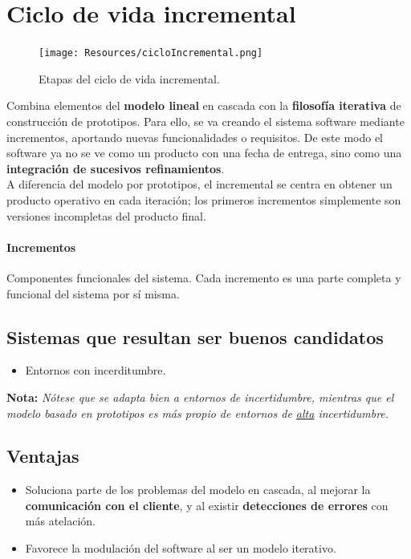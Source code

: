 \section{Ciclo de vida incremental}
\begin{figure}[H]
   \centering
   \texttt{[image: Resources/cicloIncremental.png]}
   \caption{Etapas del ciclo de vida incremental.}
   \label{fig:procesoIncremental}
\end{figure}

Combina elementos del \textbf{modelo lineal} en cascada con la \textbf{filosofía iterativa} de construcción de prototipos. Para ello, se va creando el sistema software mediante incrementos, aportando nuevas funcionalidades o requisitos. De este modo el software ya no se ve como un producto con una fecha de entrega, sino como una \textbf{integración de sucesivos refinamientos}.\\

A diferencia del modelo por prototipos, el incremental se centra en obtener un producto operativo en cada iteración; los primeros incrementos simplemente son versiones incompletas del producto final.

\paragraph{Incrementos} Componentes funcionales del sistema. Cada incremento es una parte completa y funcional del sistema por sí misma.

\subsection{Sistemas que resultan ser buenos candidatos}

\begin{itemize}
   \item Entornos con incerditumbre.
\end{itemize}

\textbf{Nota:} \textit{Nótese que se adapta bien a entornos de incertidumbre, mientras que el modelo basado en prototipos es más propio de entornos de \uline{alta} incertidumbre.}

\subsection{Ventajas}

\begin{itemize}
   \item Soluciona parte de los problemas del modelo en cascada, al mejorar la \textbf{comunicación con el cliente}, y al existir \textbf{detecciones de errores} con más atelación.
   \item Favorece la modulación del software al ser un modelo iterativo.
\end{itemize}

